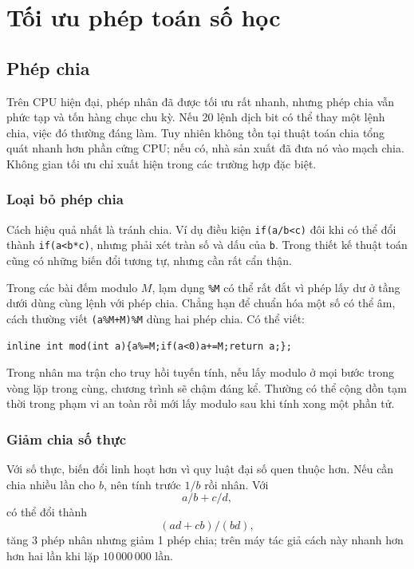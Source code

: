 \documentclass[11pt]{article}
\begin{document}
\section{Tối ưu phép toán số học}

\subsection{Phép chia}

Trên CPU hiện đại, phép nhân đã được tối ưu rất nhanh, nhưng phép chia vẫn
phức tạp và tốn hàng chục chu kỳ. Nếu 20 lệnh dịch bit có thể thay một lệnh
chia, việc đó thường đáng làm. Tuy nhiên không tồn tại thuật toán chia tổng
quát nhanh hơn phần cứng CPU; nếu có, nhà sản xuất đã đưa nó vào mạch chia.
Không gian tối ưu chỉ xuất hiện trong các trường hợp đặc biệt.

\subsubsection{Loại bỏ phép chia}

Cách hiệu quả nhất là tránh chia. Ví dụ điều kiện \texttt{if(a/b<c)} đôi khi
có thể đổi thành \texttt{if(a<b*c)}, nhưng phải xét tràn số và dấu của
\texttt{b}. Trong thiết kế thuật toán cũng có những biến đổi tương tự, nhưng
cần rất cẩn thận.

Trong các bài đếm modulo \(M\), lạm dụng \texttt{\%M} có thể rất đắt vì phép
lấy dư ở tầng dưới dùng cùng lệnh với phép chia. Chẳng hạn để chuẩn hóa một
số có thể âm, cách thường viết \texttt{(a\%M+M)\%M} dùng hai phép chia. Có thể
viết:
\begin{verbatim}
inline int mod(int a){a%=M;if(a<0)a+=M;return a;};
\end{verbatim}

Trong nhân ma trận cho truy hồi tuyến tính, nếu lấy modulo ở mọi bước trong
vòng lặp trong cùng, chương trình sẽ chậm đáng kể. Thường có thể cộng dồn tạm
thời trong phạm vi an toàn rồi mới lấy modulo sau khi tính xong một phần tử.

\subsubsection{Giảm chia số thực}

Với số thực, biến đổi linh hoạt hơn vì quy luật đại số quen thuộc hơn. Nếu
cần chia nhiều lần cho \(b\), nên tính trước \(1/b\) rồi nhân. Với
\[
  a/b+c/d,
\]
có thể đổi thành
\[
  (a d+c b)/(b d),
\]
tăng 3 phép nhân nhưng giảm 1 phép chia; trên máy tác giả cách này nhanh hơn
hơn hai lần khi lặp \(10\,000\,000\) lần.
\end{document}
